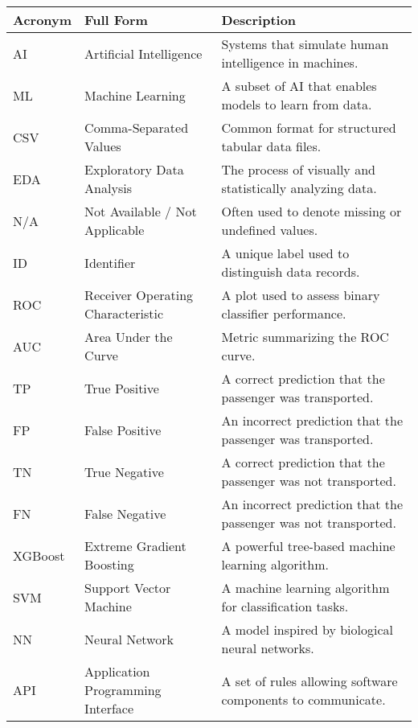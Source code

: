 \documentclass[15pt]{article}
\begin{document}
\begin{table}[h!]
    \centering
    \begin{tabular}{|l|l|p{8cm}|}
    \hline
    \textbf{Acronym} & \textbf{Full Form} & \textbf{Description} \\
    \hline
    AI    & Artificial Intelligence            & Systems that simulate human intelligence in machines. \\
    ML    & Machine Learning                   & A subset of AI that enables models to learn from data. \\
    CSV   & Comma-Separated Values             & Common format for structured tabular data files. \\
    EDA   & Exploratory Data Analysis          & The process of visually and statistically analyzing data. \\
    N/A   & Not Available / Not Applicable     & Often used to denote missing or undefined values. \\
    ID    & Identifier                         & A unique label used to distinguish data records. \\
    ROC   & Receiver Operating Characteristic & A plot used to assess binary classifier performance. \\
    AUC   & Area Under the Curve               & Metric summarizing the ROC curve. \\
    TP    & True Positive                      & A correct prediction that the passenger was transported. \\
    FP    & False Positive                     & An incorrect prediction that the passenger was transported. \\
    TN    & True Negative                      & A correct prediction that the passenger was not transported. \\
    FN    & False Negative                     & An incorrect prediction that the passenger was not transported. \\
    XGBoost & Extreme Gradient Boosting        & A powerful tree-based machine learning algorithm. \\
    SVM   & Support Vector Machine             & A machine learning algorithm for classification tasks. \\
    NN    & Neural Network                     & A model inspired by biological neural networks. \\
    API   & Application Programming Interface  & A set of rules allowing software components to communicate. \\

\end{tabular}
\end{table}
\end{document}
